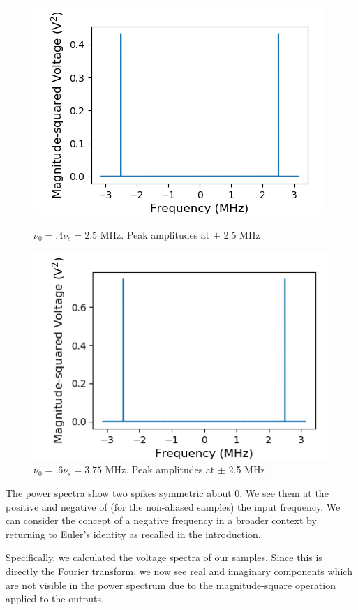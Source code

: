 \documentclass[a4paper]{article}
\begin{document}
\begin{figure}
\centering
\begin{minipage}{.5\textwidth}
	\centering
	\includegraphics[width=.8\linewidth]{5-2/pow4}
	\caption{$\nu_0 = .4 \nu_s = 2.5$ MHz. Peak amplitudes at $\pm$ 2.5 MHz}
	\label{fig:NyPw4}
\end{minipage}%
\begin{minipage}{.5\textwidth}
	\centering
	\includegraphics[width=.8\linewidth]{5-2/pow6}
	\caption{$\nu_0 = .6 \nu_s = 3.75$ MHz. Peak amplitudes at $\pm$ 2.5 MHz}
	\label{fig:NyPw6}
\end{minipage}
\end{figure}


The power spectra show two spikes symmetric about 0. We see them at the positive and negative of (for the non-aliased samples) the input frequency. We can consider the concept of a negative frequency in a broader context by returning to Euler's identity as recalled in the introduction.

Specifically, we calculated the voltage spectra of our samples. Since this is directly the Fourier transform, we now see real and imaginary components which are not visible in the power spectrum due to the magnitude-square operation applied to the outputs.
\end{document}

